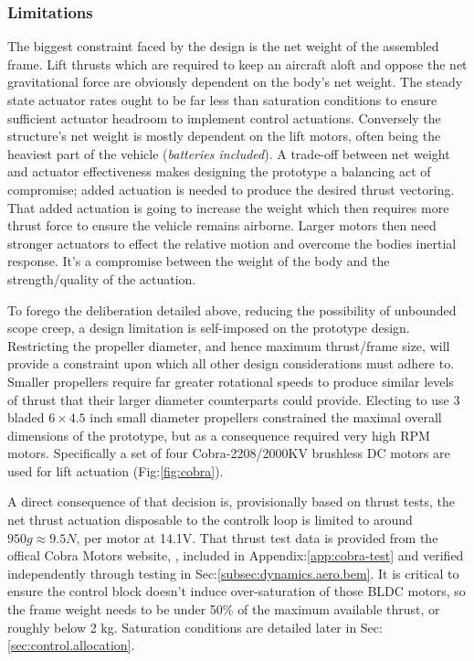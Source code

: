 \subsubsection{Limitations}
\label{subsubsec:intro.foreword.limits}
The biggest constraint faced by the design is the net weight of the assembled frame. Lift thrusts which are required to keep an aircraft aloft and oppose the net gravitational force are obviously dependent on the body's net weight. The steady state actuator rates ought to be far less than saturation conditions to ensure sufficient actuator headroom to implement control actuations. Conversely the structure's net weight is mostly dependent on the lift motors, often being the heaviest part of the vehicle (\emph{batteries included}). A trade-off between net weight and actuator effectiveness makes designing the prototype a balancing act of compromise; added actuation is needed to produce the desired thrust vectoring. That added actuation is going to increase the weight which then requires more thrust force to ensure the vehicle remains airborne. Larger motors then need stronger actuators to effect the relative motion and overcome the bodies inertial response. It's a compromise between the weight of the body and the strength/quality of the actuation.
\par
To forego the deliberation detailed above, reducing the possibility of unbounded scope creep, a design limitation is self-imposed on the prototype design. Restricting the propeller diameter, and hence maximum thrust/frame size, will provide a constraint upon which all other design considerations must adhere to. Smaller propellers require far greater rotational speeds to produce similar levels of thrust that their larger diameter counterparts could provide. Electing to use 3 bladed $6\times 4.5$ inch small diameter propellers constrained the maximal overall dimensions of the prototype, but as a consequence required very high RPM motors. Specifically a set of four Cobra-2208/2000KV\cite{cobramotor} brushless DC motors are used for lift actuation (Fig:\ref{fig:cobra}). 
\par
A direct consequence of that decision is, provisionally based on thrust tests, the net thrust actuation disposable to the controlk loop is limited to around $950g\approx 9.5 N$, per motor at 14.1V. That thrust test data is provided from the offical Cobra Motors website, \cite{cobramotor}, included in Appendix:\ref{app:cobra-test} and verified independently through testing in Sec:\ref{subsec:dynamics.aero.bem}. It is critical to ensure the control block doesn't induce over-saturation of those BLDC motors, so the frame weight needs to be under 50\% of the maximum available thrust, or roughly below 2 kg. Saturation conditions are detailed later in Sec: \ref{sec:control.allocation}.
